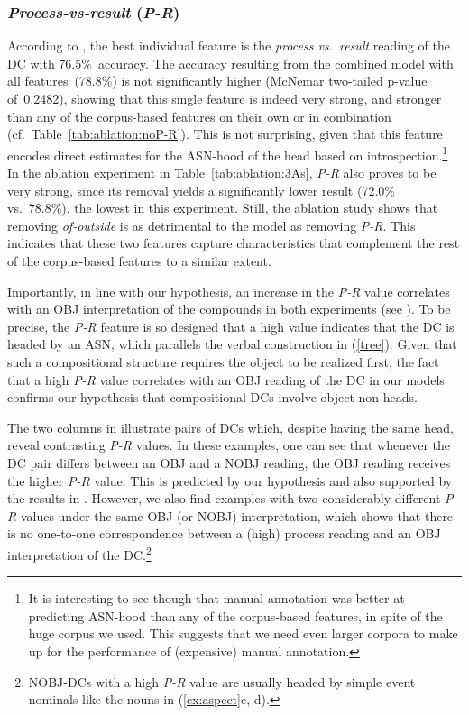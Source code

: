 \documentclass[output=paper]{langsci/langscibook}
\begin{document}
\subsubsection{\textit{Process-vs-result} (\textit{P-R})}\label{sec:discussion-int-P-R}
According to , the best individual feature is the \textit{process vs.\ result} reading of the DC with 76.5\%~accuracy. 
The accuracy resulting from the combined model with all features~(78.8\%) is not significantly higher (McNemar two-tailed p-value of~0.2482), showing that this single feature is indeed very strong, and stronger than any of the corpus-based features on their own or in combination  {(cf.~Table~\ref{tab:ablation:noP-R})}. This is not surprising, given that this feature encodes direct estimates for the ASN-hood of the head based on introspection.\footnote{It is interesting to see though that manual annotation was better at predicting ASN-hood than any of the corpus-based features, in spite of the huge corpus we used. This suggests that we need even larger corpora to make up for the performance of (expensive) manual annotation.} In the ablation experiment  in Table~\ref{tab:ablation:3As}, \textit{P-R} also proves to be very strong, since its removal yields a significantly lower result ({72.0}\% vs.~78.8\%), the lowest  in this experiment. Still, the ablation study shows that removing \textit{of-outside} is as detrimental to the model as removing \textit{P-R}. This indicates that these two features capture characteristics that complement the rest of the corpus-based features to a similar extent.

Importantly, in line with our hypothesis, an increase in the \textit{P-R} value correlates with an OBJ interpretation of the compounds in both experiments (see  ).  To be precise, the \textit{P-R} feature is so designed that a high value indicates that the DC is headed by an ASN, which parallels  the verbal construction in (\ref{tree}). Given that such a compositional structure requires the object to be realized first, the fact that a high \textit{P-R} value correlates with an OBJ reading of the DC in our models confirms our hypothesis that compositional DCs involve object non-heads.

The two columns in  illustrate pairs of DCs which, despite having the same head, reveal contrasting \textit{P-R} values. In these examples, one can see that whenever the DC pair differs  {between an OBJ and a} NOBJ reading, the OBJ reading receives the higher \textit{P-R} value. This is predicted by our hypothesis and also supported by the results in .
However, we also find examples with two  {considerably} different \textit{P-R} values under the same OBJ (or NOBJ) interpretation, which shows that there is no one-to-one correspondence between a (high) process reading and an OBJ interpretation of the DC.\footnote{ {NOBJ-DCs with a high \textit{P-R} value are usually headed by simple event nominals like the nouns in (\ref{ex:aspect}c, d).}} 
\end{document}
